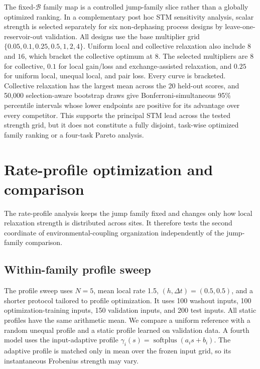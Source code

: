 The fixed-\(\mathcal B\) family map is a controlled jump-family slice rather
than a globally optimized ranking. In a complementary post hoc STM sensitivity
analysis, scalar strength is selected separately for six non-dephasing process
designs by leave-one-reservoir-out validation. All designs use the base
multiplier grid \(\{0.05,0.1,0.25,0.5,1,2,4\}\). Uniform local and collective
relaxation also include \(8\) and \(16\), which bracket the collective optimum
at \(8\). The selected multipliers are \(8\) for collective, \(0.1\) for local
gain/loss and exchange-assisted relaxation, and \(0.25\) for uniform local,
unequal local, and pair loss. Every curve is bracketed. Collective relaxation
has the largest mean across the 20 held-out scores, and 50,000 selection-aware
bootstrap draws give Bonferroni-simultaneous 95\% percentile intervals
whose lower endpoints are positive for its advantage over every competitor.
This supports the principal STM lead across the tested strength grid, but it
does not constitute a fully disjoint, task-wise optimized family ranking or a
four-task Pareto analysis.

\FloatBarrier
\section{Rate-profile optimization and comparison}
\label{app:experiment2}

The rate-profile analysis keeps the jump family fixed and changes only how
local relaxation strength is distributed across sites.  It therefore tests
the second coordinate of environmental-coupling organization independently of the jump-family
comparison.

\subsection{Within-family profile sweep}

The profile sweep uses \(N=5\), mean local rate 1.5,
\((h,\Delta t)=(0.5,0.5)\), and a shorter protocol tailored to profile
optimization.  It uses 100 washout inputs, 100 optimization-training inputs,
150 validation inputs, and 200 test inputs.  All static profiles have the
same arithmetic mean.  We compare a uniform reference with a random unequal
profile and a static profile learned on validation data.  A fourth model uses
the input-adaptive profile
\(\gamma_i(s)=\operatorname{softplus}(a_i s+b_i)\).  The adaptive profile is
matched only in mean over the frozen input grid, so its instantaneous
Frobenius strength may vary.

